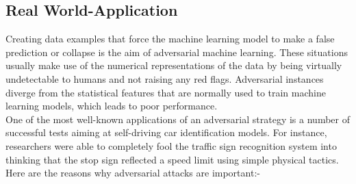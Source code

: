 \documentclass[ 12pt,a4paper,twocolumn,fleqn]{article}
\begin{document}
\subsection{Real World-Application}
Creating data examples that force the machine learning model to make a false prediction or collapse is the aim of adversarial machine learning. These situations usually make use of the numerical representations of the data by being virtually undetectable to humans and not raising any red flags.
Adversarial instances diverge from the statistical features that are normally used to train machine learning models, which leads to poor performance.\\
%
One of the most well-known applications of an adversarial strategy is a number of successful tests aiming at self-driving car identification models. For instance, researchers were able to completely fool the traffic sign recognition system into thinking that the stop sign reflected a speed limit using simple physical tactics.\\
Here are the reasons why adversarial attacks are important:-
\end{document}
